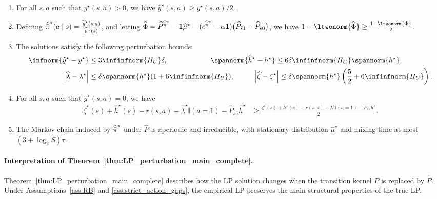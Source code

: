 \documentclass[mnsc,nonblindrev]{informs3}
\newcommand{\Phat}{\widehat{P}}
\newcommand{\one}{\mathbf{1}}
\newcommand{\pihbst}{\widehat{\Bar{\pi}}^\star}
\newcommand{\hhat}{\widehat{h}}
\newcommand{\phihat}{\widehat{\Phi}}
\newcommand{\muhat}{\widehat{\mu}}
\newcommand{\yhat}{\widehat{y}}
\newcommand{\zetahat}{\widehat{\zeta}}
\newcommand{\lambdahat}{\widehat{\lambda}}
\begin{document}
\begin{theorem}
\begin{enumerate}
        \item For all $s,a$ such that $y^\star(s,a)>0$, we have $\yhat^\star(s,a) \geq y^\star(s,a)/2$.
        \item Defining $\pihbst(a \mid s) = \frac{\yhat^\star(s,a)}{\muhat^\star(s)}$, and letting $\phihat = \Phat^{\pihbst}-\one\muhat^\star -(c^{\pihbst}-\alpha\one) \bigl(\Phat_{\tilde s 1} -\Phat_{\tilde s 0}\bigr)$, we have
        $
            1 - \ltwonorm{\phihat} \geq \frac{1 - \ltwonorm{\Phi}}{2}.
        $
        \item The solutions satisfy the following perturbation bounds:
        \begin{align*}
            \infnorm{\yhat^\star - y^\star} &\leq  3 \infinfnorm{H_U}\delta,
            \qquad\qquad\qquad
            \spannorm{\hhat^\star - h^\star} \leq 6 \delta \infinfnorm{H_U} \spannorm{h^\star}, \\
            \left| \lambdahat - \lambda^\star \right| & \leq  \delta \spannorm{h^\star}(1 + 6  \infinfnorm{H_U} ), 
            \qquad\;\;\;
            \left| \zetahat - \zeta^\star \right|  \leq \delta \spannorm{h^\star}\left( \frac{5}{2}  + 6  \infinfnorm{H_U} \right). 
        \end{align*}
        \item For all $s,a$ such that $\yhat^\star(s,a)=0$, we have
        \begin{align*}
            \zetahat^\star(s) +  \hhat^\star(s) -r(s, a) - \lambdahat^\star \mathbb{I}(a=1) - \Phat_{s a}\hhat^\star 
            &\geq \frac{\zeta^\star(s) +  h^\star(s) -r(s, a) - \lambda^\star \mathbb{I}(a=1) - P_{s a}h^\star}{2}.
        \end{align*}
        \item The Markov chain induced by $\pihbst$ under $\Phat$ is aperiodic and irreducible, with stationary distribution $\muhat^\star$ and mixing time at most $(3+\log_2S)\tau$.
    \end{enumerate}
\end{theorem}

\paragraph{Interpretation of Theorem~\ref{thm:LP_perturbation_main_complete}.}
Theorem~\ref{thm:LP_perturbation_main_complete} describes how the LP
solution changes when the transition kernel \(P\) is replaced by
\(\widehat P\). Under Assumptions~\ref{ass:RB} and
\ref{ass:strict_action_gaps}, the empirical LP preserves the main structural
properties of the true LP.
\end{document}
